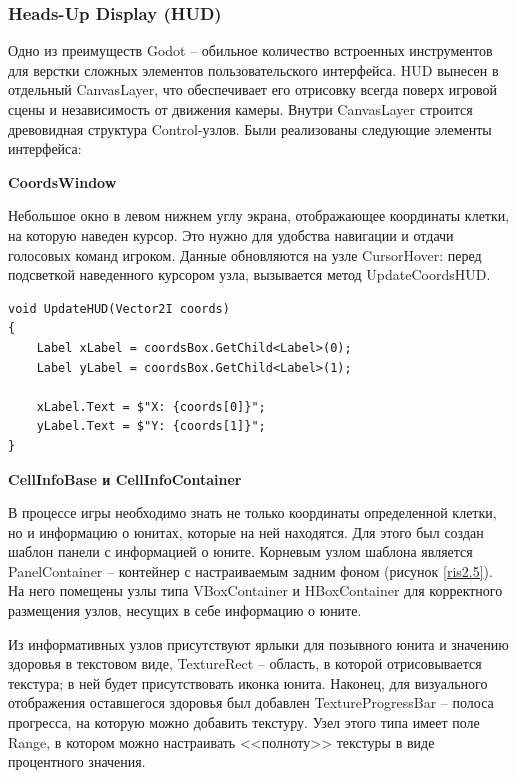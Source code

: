         
        \subsubsection{Heads-Up Display (HUD)}

            Одно из преимуществ Godot -- обильное количество встроенных инструментов для верстки сложных элементов пользовательского интерфейса. HUD вынесен в отдельный CanvasLayer, 
            что обеспечивает его отрисовку всегда поверх игровой сцены и независимость от движения камеры. Внутри CanvasLayer строится древовидная структура Control-узлов.
            Были реализованы следующие элементы интерфейса:

            \textbf{CoordsWindow}

            Небольшое окно в левом нижнем углу экрана, отображающее координаты клетки, на которую наведен курсор. Это нужно для удобства навигации и отдачи голосовых команд игроком.
            Данные обновляются на узле CursorHover: перед подсветкой наведенного курсором узла, вызывается метод UpdateCoordsHUD.
            \begin{lstlisting}[caption=обновление интерфейса]
void UpdateHUD(Vector2I coords)
{
    Label xLabel = coordsBox.GetChild<Label>(0);
    Label yLabel = coordsBox.GetChild<Label>(1);

    xLabel.Text = $"X: {coords[0]}";
    yLabel.Text = $"Y: {coords[1]}";
}
            \end{lstlisting}

            \textbf{CellInfoBase и CellInfoContainer}
            
            В процессе игры необходимо знать не только координаты определенной клетки, но и информацию о юнитах, которые на ней находятся. Для этого был создан шаблон
            панели с информацией о юните. Корневым узлом шаблона является PanelContainer -- контейнер с настраиваемым задним фоном (рисунок \ref{ris2.5}). На него помещены узлы типа VBoxContainer и
            HBoxContainer для корректного размещения узлов, несущих в себе информацию о юните.

            Из информативных узлов присутствуют ярлыки для позывного юнита и значению здоровья в текстовом виде, TextureRect -- область, в которой отрисовывается текстура; в ней будет
            присутствовать иконка юнита. Наконец, для визуального отображения оставшегося здоровья был добавлен TextureProgressBar -- полоса прогресса, на которую можно добавить
            текстуру. Узел этого типа имеет поле Range, в котором можно настраивать <<полноту>> текстуры в виде процентного значения.

